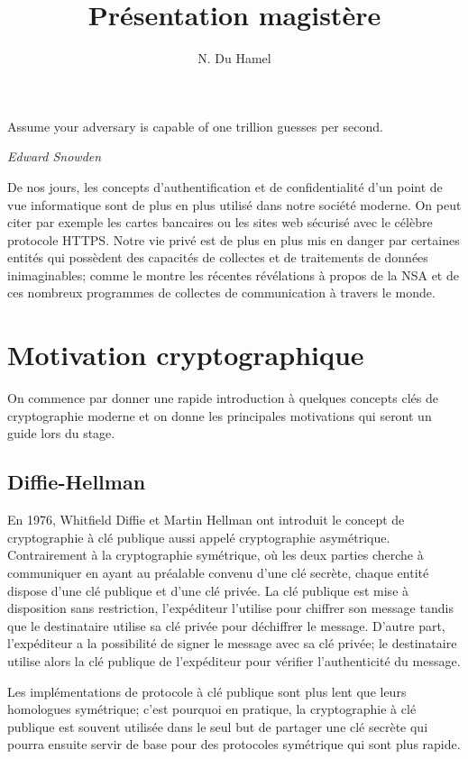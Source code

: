 \documentclass[a4paper]{article}
\theoremstyle{definition}
\theoremstyle{remark}
\numberwithin{equation}{section}
\begin{document}
\title{Présentation magistère}
\author{N. Du Hamel}
\maketitle

\epigraph{Assume your adversary is capable of one trillion guesses per second.}{\textit{Edward Snowden}}

De nos jours, les concepts d’authentification et de confidentialité d'un point de vue informatique sont de plus en plus utilisé dans notre société moderne. On peut citer par exemple les cartes bancaires ou les sites web sécurisé avec le célèbre protocole HTTPS. Notre vie privé est de plus en plus mis en danger par certaines entités qui possèdent des capacités de collectes et de traitements de données inimaginables; comme le montre les récentes révélations à propos de la NSA et de ces nombreux programmes de collectes de communication à travers le monde.

\section{Motivation cryptographique}

On commence par donner une rapide introduction à quelques concepts clés de cryptographie moderne et on donne les principales motivations qui seront un guide lors du stage.

\subsection{Diffie-Hellman}
En 1976, Whitfield Diffie et Martin Hellman \cite{diffie-hellman} ont introduit le concept de cryptographie à clé publique aussi appelé cryptographie asymétrique. Contrairement à la cryptographie symétrique, où les deux parties cherche à communiquer en ayant au préalable convenu d'une clé secrète, chaque entité dispose d'une clé publique et d'une clé privée. La clé publique est mise à disposition sans restriction, l'expéditeur l'utilise pour chiffrer son message tandis que le destinataire utilise sa clé privée pour déchiffrer le message. D'autre part, l'expéditeur a la possibilité de signer le message avec sa clé privée; le destinataire utilise alors la clé publique de l'expéditeur pour vérifier l'authenticité du message.

Les implémentations de protocole à clé publique sont plus lent que leurs homologues symétrique; c'est pourquoi en pratique, la cryptographie à clé publique est souvent utilisée dans le seul but de partager une clé secrète qui pourra ensuite servir de base pour des protocoles symétrique qui sont plus rapide.
\end{document}
